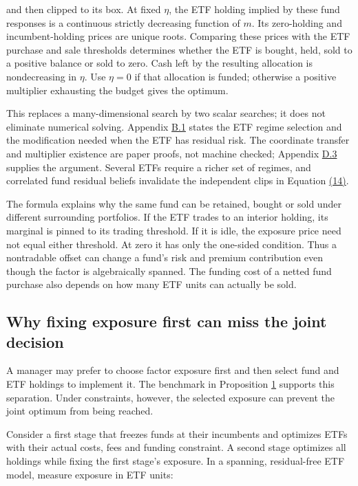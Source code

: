 \documentclass[11pt]{article}
\begin{document}
and then clipped to its box. At fixed \(\eta\), the ETF holding implied by these fund responses is a continuous strictly decreasing function of \(m\). Its zero-holding and incumbent-holding prices are unique roots. Comparing these prices with the ETF purchase and sale thresholds determines whether the ETF is bought, held, sold to a positive balance or sold to zero. Cash left by the resulting allocation is nondecreasing in \(\eta\). Use \(\eta=0\) if that allocation is funded; otherwise a positive multiplier exhausting the budget gives the optimum.

This replaces a many-dimensional search by two scalar searches; it does not eliminate numerical solving. Appendix \hyperref[sec:B.1]{B.1} states the ETF regime selection and the modification needed when the ETF has residual risk. The coordinate transfer and multiplier existence are paper proofs, not machine checked; Appendix \hyperref[sec:D.3]{D.3} supplies the argument. Several ETFs require a richer set of regimes, and correlated fund residual beliefs invalidate the independent clips in Equation \hyperref[eq:14]{(14)}.

The formula explains why the same fund can be retained, bought or sold under different surrounding portfolios. If the ETF trades to an interior holding, its marginal is pinned to its trading threshold. If it is idle, the exposure price need not equal either threshold. At zero it has only the one-sided condition. Thus a nontradable offset can change a fund's risk and premium contribution even though the factor is algebraically spanned. The funding cost of a netted fund purchase also depends on how many ETF units can actually be sold.

\subsection{Why fixing exposure first can miss the joint decision}\label{sec:3.4}

A manager may prefer to choose factor exposure first and then select fund and ETF holdings to implement it. The benchmark in Proposition \hyperref[res:Proposition-1]{1} supports this separation. Under constraints, however, the selected exposure can prevent the joint optimum from being reached.

Consider a first stage that freezes funds at their incumbents and optimizes ETFs with their actual costs, fees and funding constraint. A second stage optimizes all holdings while fixing the first stage's exposure. In a spanning, residual-free ETF model, measure exposure in ETF units:
\end{document}
